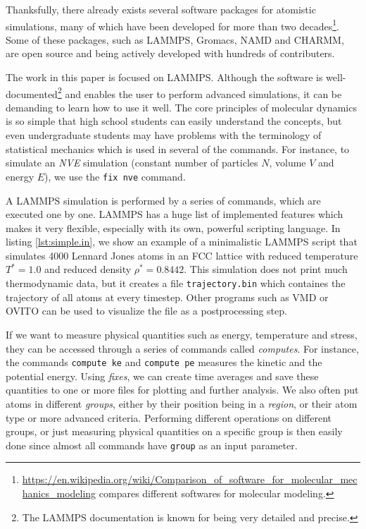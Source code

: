 \documentclass[aps,pre,twocolumn,letterpaper,floatfix,nofootinbib]{revtex4}
\newcommand{\code}[1]{\colorbox{light-gray}{\color{RawSienna}\texttt{#1}}}
\begin{document}
Thanksfully, there already exists several software packages for atomistic simulations, many of which have been developed for more than two decades\footnote{\url{https://en.wikipedia.org/wiki/Comparison_of_software_for_molecular_mechanics_modeling} compares different softwares for molecular modeling.}.
Some of these packages, such as LAMMPS\citep{Plimpton1995Fast}, Gromacs\citep{berendsen1995gromacs}, NAMD\citep{Phillips2005Scalable} and CHARMM\citep{brooks2009charmm}, are open source and being actively developed with hundreds of contributers.



The work in this paper is focused on LAMMPS.
Although the software is well-documented\footnote{The LAMMPS documentation is known for being very detailed and precise.} and enables the user to perform advanced simulations, it can be demanding to learn how to use it well.
The core principles of molecular dynamics is so simple that high school students can easily understand the concepts, but even undergraduate students may have problems with the terminology of statistical mechanics which is used in several of the commands.
For instance, to simulate an \textit{NVE} simulation (constant number of particles $N$, volume $V$ and energy $E$), we use the \code{fix nve} command.

A LAMMPS simulation is performed by a series of commands, which are executed one by one.
LAMMPS has a huge list of implemented features which makes it very flexible, especially with its own, powerful scripting language.
In listing \ref{lst:simple.in}, we show an example of a minimalistic LAMMPS script that simulates 4000 Lennard Jones atoms in an FCC lattice with reduced temperature $T^*=1.0$ and reduced density $\rho^* = 0.8442$.
This simulation does not print much thermodynamic data, but it creates a file \code{trajectory.bin} which containes the trajectory of all atoms at every timestep.
Other programs such as VMD\citep{Humphrey1996Vmd} or OVITO\citep{Stukowski2009Visualization} can be used to visualize the file as a postprocessing step.

If we want to measure physical quantities such as energy, temperature and stress, they can be accessed through a series of commands called \textit{computes}.
For instance, the commands \code{compute ke} and \code{compute pe} measures the kinetic and the potential energy.
Using \textit{fixes}, we can create time averages and save these quantities to one or more files for plotting and further analysis.
We also often put atoms in different \textit{groups}, either by their position being in a \textit{region}, or their atom type or more advanced criteria.
Performing different operations on different groups, or just measuring physical quantities on a specific group is then easily done since almost all commands have \code{group} as an input parameter.
\end{document}
